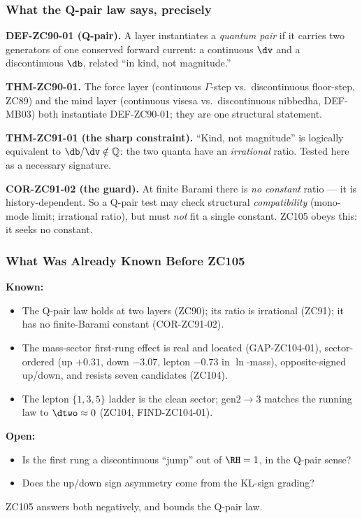 \documentclass[12pt, a4paper]{article}
\begin{document}
\subsubsection{What the Q-pair law says, precisely}

\begin{keybox}[title={The Q-pair law (ZC90/91), in the form ZC105 tests}]
\textbf{DEF-ZC90-01 (Q-pair).} A layer instantiates a \emph{quantum pair} if it
carries two generators of one conserved forward current: a continuous $\dv$ and a
discontinuous $\db$, related ``in kind, not magnitude.''

\textbf{THM-ZC90-01.} The force layer (continuous $\Gamma$-step vs.\ discontinuous
floor-step, ZC89) and the mind layer (continuous visesa vs.\ discontinuous
nibbedha, DEF-MB03) both instantiate DEF-ZC90-01; they are one structural
statement.

\textbf{THM-ZC91-01 (the sharp constraint).} ``Kind, not magnitude'' is
logically equivalent to $\db/\dv\notin\mathbb{Q}$: the two quanta have an
\emph{irrational} ratio. Tested here as a necessary signature.

\textbf{COR-ZC91-02 (the guard).} At finite Barami there is \emph{no constant}
ratio --- it is history-dependent. So a Q-pair test may check structural
\emph{compatibility} (mono-mode limit; irrational ratio), but must \emph{not}
fit a single constant. ZC105 obeys this: it seeks no constant.
\end{keybox}

\subsubsection{What Was Already Known Before ZC105}

\begin{keybox}[title={Pre-ZC105 Status}]
\textbf{Known:}
\begin{itemize}[leftmargin=2em, noitemsep]
  \item The Q-pair law holds at two layers (ZC90); its ratio is irrational
    (ZC91); it has no finite-Barami constant (COR-ZC91-02).
  \item The mass-sector first-rung effect is real and located (GAP-ZC104-01),
    sector-ordered (up $+0.31$, down $-3.07$, lepton $-0.73$ in $\ln$-mass),
    opposite-signed up/down, and resists seven candidates (ZC104).
  \item The lepton $\{1,3,5\}$ ladder is the clean sector; gen$2{\to}3$ matches
    the running law to $\dtwo\approx0$ (ZC104, FIND-ZC104-01).
\end{itemize}

\textbf{Open:}
\begin{itemize}[leftmargin=2em, noitemsep]
  \item Is the first rung a discontinuous ``jump'' out of $\RH=1$, in the Q-pair
    sense?
  \item Does the up/down sign asymmetry come from the KL-sign grading?
\end{itemize}

ZC105 answers both negatively, and bounds the Q-pair law.
\end{keybox}
\end{document}
